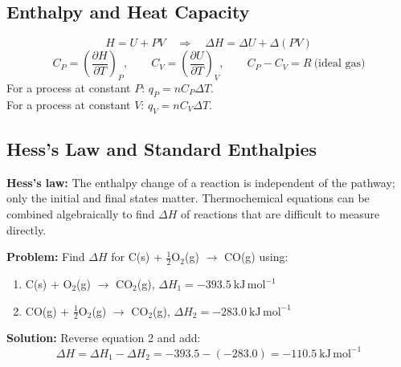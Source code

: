 \documentclass[12pt,a4paper]{article}
\begin{document}
\subsection{Enthalpy and Heat Capacity}
\begin{tcolorbox}[formulabox, title={Enthalpy and Heat Capacity Relations}]
\[
H = U + PV \quad\Rightarrow\quad \Delta H = \Delta U + \Delta(PV)
\]
\[
C_P = \left(\frac{\partial H}{\partial T}\right)_P, \qquad C_V = \left(\frac{\partial U}{\partial T}\right)_V, \qquad C_P - C_V = R\ \text{(ideal gas)}
\]
For a process at constant $P$: $q_P = n C_P \Delta T$.\\
For a process at constant $V$: $q_V = n C_V \Delta T$.
\end{tcolorbox}

\subsection{Hess's Law and Standard Enthalpies}
\begin{tcolorbox}[defbox]
\textbf{Hess's law:} The enthalpy change of a reaction is independent of the pathway; only the initial and final states matter. Thermochemical equations can be combined algebraically to find $\Delta H$ of reactions that are difficult to measure directly.
\end{tcolorbox}

\begin{tcolorbox}[tikzbox, title={Hess's Law Energy Cycle for Combustion of Carbon}]
\centering
{}
\end{tcolorbox}

\begin{tcolorbox}[examplebox, title={Solved Example: Hess's Law}]
\textbf{Problem:} Find $\Delta H$ for C(s) + $\tfrac{1}{2}$O$_2$(g) $\to$ CO(g) using:
\begin{enumerate}[leftmargin=*, itemsep=1pt, topsep=1pt]
  \item C(s) + O$_2$(g) $\to$ CO$_2$(g), $\Delta H_1 = -393.5\ \mathrm{kJ\,mol^{-1}}$
  \item CO(g) + $\tfrac{1}{2}$O$_2$(g) $\to$ CO$_2$(g), $\Delta H_2 = -283.0\ \mathrm{kJ\,mol^{-1}}$
\end{enumerate}
\textbf{Solution:} Reverse equation 2 and add:
\[
\Delta H = \Delta H_1 - \Delta H_2 = -393.5 - (-283.0) = -110.5\ \mathrm{kJ\,mol^{-1}}
\]
\end{tcolorbox}
\end{document}
